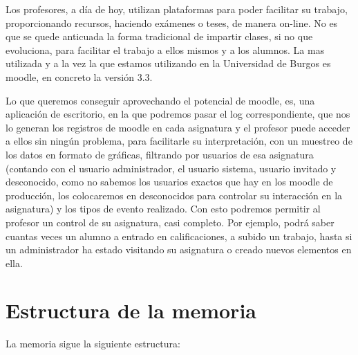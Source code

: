 
Los profesores, a día de hoy, utilizan plataformas para poder facilitar su trabajo, proporcionando recursos, haciendo exámenes o teses, de manera on-line. No es que se quede anticuada la forma tradicional de impartir clases, si no que evoluciona, para facilitar el trabajo a ellos mismos y a los alumnos.
La mas utilizada y a la vez la que estamos utilizando en la Universidad de Burgos es moodle, en concreto la versión 3.3.




Lo que queremos conseguir aprovechando el potencial de moodle, es, una aplicación de escritorio, en la que podremos pasar el log correspondiente, que nos lo generan los registros de moodle en cada asignatura y el profesor puede acceder a ellos sin ningún problema, para facilitarle su interpretación, con un muestreo de los datos en formato de gráficas, filtrando por usuarios de esa asignatura (contando con el usuario administrador, el usuario sistema, usuario invitado y desconocido, como no sabemos los usuarios exactos que hay en los moodle de producción, los colocaremos en desconocidos para controlar su interacción en la asignatura) y los tipos de evento realizado. 
Con esto podremos permitir al profesor un control de su asignatura, casi completo. Por ejemplo, podrá saber cuantas veces un alumno a entrado en calificaciones, a subido un trabajo, hasta si un administrador ha estado visitando su asignatura o creado nuevos elementos en ella.

\section{Estructura de la memoria}\label{estructura-de-la-memoria}

La memoria sigue la siguiente estructura:

